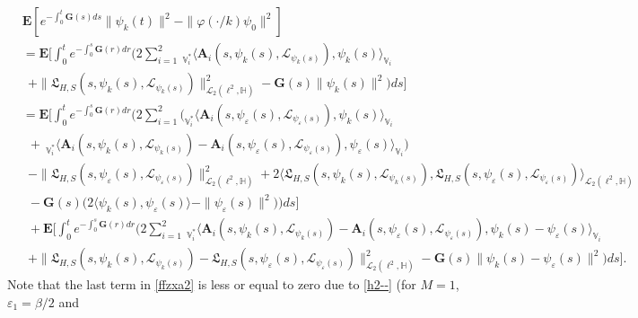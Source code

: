 \documentclass[11pt]{article}
\numberwithin{equation}{section}
\begin{document}
\begin{align}&\label{ffzxa2}
		\mathbf{E} \left[e^{-\int_0^{t}
\mathbf{G}(s)ds}
		\|\psi_{k}(t)
\|^2-
		\|\varphi(\cdot/k)\psi_0\|^2\right]
		\nonumber\\
		& =
		\mathbf{E}
		\Bigg[
		\int_0^{t}
		e^{-\int_0^s\mathbf{G}(r)dr}
		\Bigg(2 \sum_{i=1}^2\ _{\mathbb{V}^*_i}\langle \mathbf{A}_i(s,\psi_k(s),\mathcal{L}_{\psi_k(s)}) ,\psi_k(s)\rangle_{\mathbb{V}_i}
 \nonumber\\&\   \ +\|\mathfrak{L}_{H,S}(s,\psi_k(s),
\mathcal{L}_{\psi_k(s)})\|^2_{\mathcal{L
}_2(\ell^2,
			\mathbb{H})}  -
	\mathbf{G}(s)
		\|\psi_{k}(s)\|^2
		\Bigg)ds\Bigg]
		\nonumber\\&=
		\mathbf{E}
		\Bigg[
		\int_0^{t}
		e^{-\int_0^s\mathbf{G}(r)dr} \Bigg(    2 \sum_{i=1}^2\Big(
_{\mathbb{V}_i^*}\langle \mathbf{A}_i(s,
\psi_\varepsilon(s),\mathcal{L}_{\psi_\varepsilon(s)}) ,\psi_k(s)\rangle_{\mathbb{V}_i}
	\nonumber\\&\ \ 	+\ _{\mathbb{V}^*_i}
		\langle \mathbf{A}_i(s,\psi_k(s),\mathcal{L}_{\psi_k(s)})
-\mathbf{A}_i(s,\psi_\varepsilon(s),
\mathcal{L}_{\psi_\varepsilon(s)}) ,\psi_\varepsilon(s)\rangle_{\mathbb{V}_i}\Big)
		\nonumber\\&\ \    -\|\mathfrak{L}_{H,S}(s,\psi_\varepsilon(s),
\mathcal{L}_{\psi_\varepsilon(s)})
		\|^2_{\mathcal{L}_2(\ell^2,
			\mathbb{H})}
		+2 \langle  \mathfrak{L}_{H,S}(s,\psi_k(s),
\mathcal{L}_{\psi_k(s)})
		, \mathfrak{L}_{H,S}(s,\psi_\varepsilon(s),
\mathcal{L}_{\psi_\varepsilon(s)})
		\rangle_{\mathcal{L}_2(\ell^2,
			\mathbb{H})}
		\nonumber\\&\ \   -
		\mathbf{G}(s) \Big(2\langle \psi_k(s)
		, \psi_\varepsilon(s)
		\rangle-
		\|\psi_\varepsilon(s)\|^2
		\Big)
		\Bigg)ds\Bigg]
		\nonumber\\&\ \ +
		\mathbf{E}
		\Bigg[
		\int_0^{t}
e^{-\int_0^s\mathbf{G}(r)dr}
		\Bigg(
		2 \sum_{i=1}^2\ _{\mathbb{V}_i^*}
		\langle \mathbf{A}_i(s,\psi_k(s),\mathcal{L}_{\psi_k(s)}
)-\mathbf{A}_i(s,\psi_\varepsilon(s),
\mathcal{L}_{\psi_\varepsilon(s)}) ,\psi_k(s)-\psi_\varepsilon(s)\rangle_{\mathbb{V}_i}
\nonumber\\&  \  \ +\|\mathfrak{L}_{H,S}(s,\psi_k(s),
\mathcal{L}_{\psi_k(s)})
		-\mathfrak{L}_{H,S}(s,\psi_\varepsilon(s),
\mathcal{L}_{\psi_\varepsilon(s)})
		\|^2_{\mathcal{L}_2(\ell^2,
			\mathbb{H})}   -
		\mathbf{G}(s)
		\|\psi_{k}(s)-\psi_\varepsilon(s)
\|^2
		\Bigg)ds\Bigg].
	\end{align}
Note that the last term in \eqref{ffzxa2}
	is less or equal to zero due to
\eqref{h2--} (for $M=1$, $\varepsilon_1=\beta/2$ and
\end{document}
